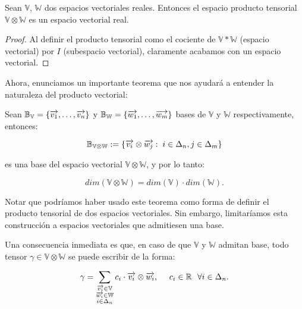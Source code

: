 \begin{proposicion}
	Sean $\mathbb{V}$, $\mathbb{W}$ dos espacios vectoriales reales. Entonces el espacio producto tensorial $\mathbb{V} \otimes \mathbb{W}$ es un espacio vectorial real.
\end{proposicion}

\begin{proof}
	Al definir el producto tensorial como el cociente de $\mathbb{V} \ast \mathbb{W}$ (espacio vectorial) por $I$ (subespacio vectorial), claramente acabamos con un espacio vectorial.
\end{proof}


Ahora, enunciamos un importante teorema que nos ayudará a entender la naturaleza del producto vectorial:

\begin{teorema} \label{th:base_prod_tensorial}
	Sean $\mathbb{B}_{\mathbb{V}} = \{\overrightarrow{v_1}, \ldots, \overrightarrow{v_n}\}$ y  $\mathbb{B}_{\mathbb{W}} = \{\overrightarrow{w_1}, \ldots, \overrightarrow{w_m}\}$ bases de $\mathbb{V}$ y  $\mathbb{W}$ respectivamente, entonces:

	\begin{equation}
		\mathbb{B}_{\mathbb{V} \otimes \mathbb{W}} := \{ \overrightarrow{v_i} \otimes \overrightarrow{w_j}: \; i \in \Delta_{n}, j \in \Delta_{m} \}
	\end{equation}


	es una base del espacio vectorial $\mathbb{V} \otimes \mathbb{W}$, y por lo tanto:

	\begin{equation}
		dim(\mathbb{V} \otimes \mathbb{W}) = dim(\mathbb{V}) \cdot dim(\mathbb{W}).
	\end{equation}

\end{teorema}

\begin{observacion}
	Notar que podríamos haber usado este teorema como forma de definir el producto tensorial de dos espacios vectoriales. Sin embargo, limitaríamos esta construcción a espacios vectoriales que admitiesen una base.
\end{observacion}

Una consecuencia inmediata es que, en caso de que $\mathbb{V}$ y $\mathbb{W}$ admitan base, todo tensor $\gamma \in \mathbb{V} \otimes \mathbb{W}$ se puede escribir de la forma:

\begin{equation}
	\gamma = \sum_{\substack{\overrightarrow{v_i} \in \mathbb{V}\\ \overrightarrow{w_i} \in \mathbb{W}\\ i \in \Delta_{n}}} c_{i} \cdot \overrightarrow{v_i} \otimes \overrightarrow{w_i}, \ \ \ \  c_i \in \mathbb{R} \ \  \forall i \in \Delta_{n}.
\end{equation}


